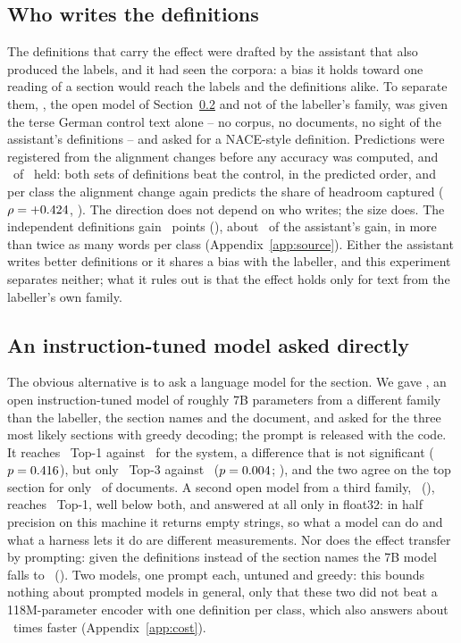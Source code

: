 \documentclass[11pt]{article}
\begin{document}
\subsection{Who writes the definitions}
\label{sec:source}

The definitions that carry the effect were drafted by the assistant that also
produced the labels, and it had seen the corpora: a bias it holds toward one
reading of a section would reach the labels and the definitions alike. To
separate them, \SourceWriter, the open model of Section~\ref{sec:llm} and not
of the labeller's family, was given the terse German control text alone -- no
corpus, no documents, no sight of the assistant's definitions -- and asked for a
NACE-style definition. Predictions were registered from the alignment changes
before any accuracy was computed, and \SourceHeld\ of \SourcePredictions\
held: both sets of definitions beat the control, in the predicted order, and
per class the alignment change again predicts the share of headroom captured
($\rho = +0.424$, \SourceRhoPStat). The direction does not depend on who
writes; the size does. The independent definitions gain
\SourceWriterGain~points (\SourceWriterPStat), about \SourceWriterShare\ of
the assistant's gain, in more than twice as many words per class
(Appendix~\ref{app:source}). Either the assistant writes better definitions or
it shares a bias with the labeller, and this experiment separates neither; what
it rules out is that the effect holds only for text from the labeller's own
family.

\subsection{An instruction-tuned model asked directly}
\label{sec:llm}

The obvious alternative is to ask a language model for the section. We gave
\LLMModel, an open instruction-tuned model of roughly 7B parameters from a
different family than the labeller, the section names and the document, and
asked for the three most likely sections with greedy decoding; the prompt is
released with the code. It reaches \LLMTopOne\ Top-1 against \OursTopOne\ for
the system, a difference that is not significant ($p = 0.416$), but only
\LLMTopThree\ Top-3 against \OursTopThree\ ($p = 0.004$;
\HolmLLMTopThreeStat), and the two agree on the top section for only
\LLMAgreeShare\ of documents. A second open model from a third family,
\LLMTwoModel\ (\LLMTwoParams), reaches \LLMTwoTopOne\ Top-1, well below both,
and answered at all only in float32: in half precision on this machine it
returns empty strings, so what a model can do and what a harness lets it do are
different measurements. Nor does the effect transfer by prompting: given the
definitions instead of the section names the 7B model falls to \LLMDefTopOne\
(\LLMDefPStat). Two models, one prompt each, untuned and greedy: this bounds
nothing about prompted models in general, only that these two did not beat a
118M-parameter encoder with one definition per class, which also answers about
\BenchLLMTimes\ times faster (Appendix~\ref{app:cost}).
\end{document}
